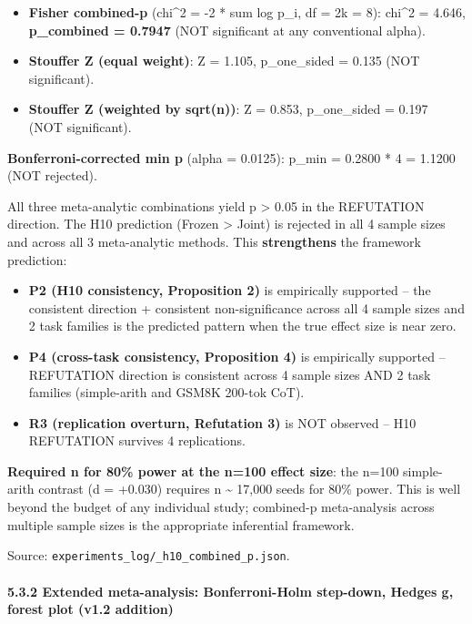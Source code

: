 \documentclass[11pt]{article}
\begin{document}
\begin{itemize}

\item
  \textbf{Fisher combined-p} (chi\^{}2 = -2 * sum log p\_i, df = 2k =
  8): chi\^{}2 = 4.646, \textbf{p\_combined = 0.7947} (NOT significant
  at any conventional alpha).
\item
  \textbf{Stouffer Z (equal weight)}: Z = 1.105, p\_one\_sided = 0.135
  (NOT significant).
\item
  \textbf{Stouffer Z (weighted by sqrt(n))}: Z = 0.853, p\_one\_sided =
  0.197 (NOT significant).
\end{itemize}

\textbf{Bonferroni-corrected min p} (alpha = 0.0125): p\_min = 0.2800 *
4 = 1.1200 (NOT rejected).

All three meta-analytic combinations yield p \textgreater{} 0.05 in the
REFUTATION direction. The H10 prediction (Frozen \textgreater{} Joint)
is rejected in all 4 sample sizes and across all 3 meta-analytic
methods. This \textbf{strengthens} the framework prediction:

\begin{itemize}

\item
  \textbf{P2 (H10 consistency, Proposition 2)} is empirically supported
  -- the consistent direction + consistent non-significance across all 4
  sample sizes and 2 task families is the predicted pattern when the
  true effect size is near zero.
\item
  \textbf{P4 (cross-task consistency, Proposition 4)} is empirically
  supported -- REFUTATION direction is consistent across 4 sample sizes
  AND 2 task families (simple-arith and GSM8K 200-tok CoT).
\item
  \textbf{R3 (replication overturn, Refutation 3)} is NOT observed --
  H10 REFUTATION survives 4 replications.
\end{itemize}

\textbf{Required n for 80\% power at the n=100 effect size}: the n=100
simple-arith contrast (d = +0.030) requires n \textasciitilde{} 17,000
seeds for 80\% power. This is well beyond the budget of any individual
study; combined-p meta-analysis across multiple sample sizes is the
appropriate inferential framework.

Source: \texttt{experiments\_log/\_h10\_combined\_p.json}.

\paragraph{5.3.2 Extended meta-analysis: Bonferroni-Holm step-down,
Hedges g, forest plot (v1.2
addition)}\label{extended-meta-analysis-bonferroni-holm-step-down-hedges-g-forest-plot-v1.2-addition}
\end{document}
